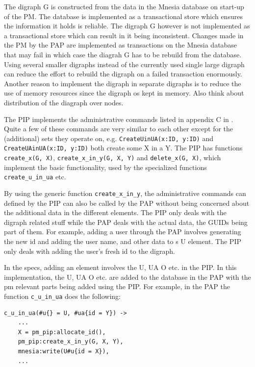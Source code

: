 \documentclass[12pt,a4paper,titlepage]{book}
\begin{document}
	The digraph G is constructed from the data in the Mnesia database on start-up of the PM. The database is implemented as a transactional store which ensures the information it holds is reliable. The digraph G however is not implemented as a transactional store which can result in it being inconsistent. Changes made in the PM by the PAP are implemented as transactions on the Mnesia database that may fail in which case the diagrah G has to be rebuild from the database. Using several smaller digraphs instead of the currently used single large digraph can reduce the effort to rebuild the digraph on a failed transaction enormously.
	Another reason to implement the digraph in separate digraphs is to reduce the use of memory resources since the digraph os kept in memory. Also think about distribution of the diagraph over nodes.
	
	The PIP implements the administrative commands listed in appendix C in \cite{NISTIR-7987-REV-1}. Quite a few of these commands are very similar to each other except for the (additional) sets they operate on, e.g. \lstinline|CreateUinUA(x:ID, y:ID)| and \lstinline|CreateUAinUA(x:ID, y:ID)| both create some X in a Y.
	The PIP has functions \lstinline|create_x(G, X)|, \lstinline|create_x_in_y(G, X, Y)| and \lstinline|delete_x(G, X)|,  which implement the basic functionality, used by the specialized functions \lstinline|create_u_in_ua| etc.
	
	By using the generic function \lstinline|create_x_in_y|, the administrative commands can defined by the PIP can also be called by the PAP without being concerned about the additional data in the different elements. The PIP only deals with the digraph related stuff while the PAP deals with the actual data, the GUIDs being part of them. For example, adding a user through the PAP involves generating the new id and adding the user name, and other data to s U element. The PIP only deals with adding the user's fresh id to the digraph.
	
	In the specs, adding an element involves the U, UA O etc. in the PIP. In this implementation, the U, UA O etc. are added to the database in the PAP with the pm relevant parts being added using the PIP. For example, in the PAP the function \lstinline|c_u_in_ua| does the following:
	
	\begin{lstlisting}[caption={Administrative routine c\_u\_in\_ua/2}]
c_u_in_ua(#u{} = U, #ua{id = Y}) ->
    ...
    X = pm_pip:allocate_id(),
    pm_pip:create_x_in_y(G, X, Y),
    mnesia:write(U#u{id = X}),
    ...\end{lstlisting}
	
\end{document}

